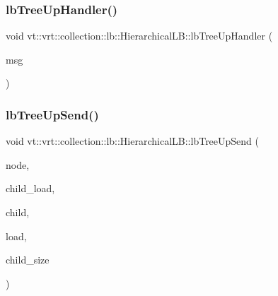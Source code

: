 \mbox{\label{structvt_1_1vrt_1_1collection_1_1lb_1_1_hierarchical_l_b_a3b67d27c10a6a7532c9c5d1a57ab722a}} 
\subsubsection{\texorpdfstring{lb\+Tree\+Up\+Handler()}{lbTreeUpHandler()}}
{\footnotesize\ttfamily void vt\+::vrt\+::collection\+::lb\+::\+Hierarchical\+L\+B\+::lb\+Tree\+Up\+Handler (\begin{DoxyParamCaption}\item[{\hyperlink{structvt_1_1vrt_1_1collection_1_1lb_1_1_l_b_tree_up_msg}{L\+B\+Tree\+Up\+Msg} $\ast$}]{msg }\end{DoxyParamCaption})\hspace{0.3cm}{\ttfamily [private]}}

\mbox{\label{structvt_1_1vrt_1_1collection_1_1lb_1_1_hierarchical_l_b_a8a9d35f8b4a8cd21461209136e64ad30}} 
\subsubsection{\texorpdfstring{lb\+Tree\+Up\+Send()}{lbTreeUpSend()}}
{\footnotesize\ttfamily void vt\+::vrt\+::collection\+::lb\+::\+Hierarchical\+L\+B\+::lb\+Tree\+Up\+Send (\begin{DoxyParamCaption}\item[{\hyperlink{namespacevt_a866da9d0efc19c0a1ce79e9e492f47e2}{Node\+Type} const}]{node,  }\item[{\hyperlink{structvt_1_1vrt_1_1collection_1_1lb_1_1_base_l_b_a215e22b9f12678303f49615ae3be05cc}{Load\+Type} const}]{child\+\_\+load,  }\item[{\hyperlink{namespacevt_a866da9d0efc19c0a1ce79e9e492f47e2}{Node\+Type} const}]{child,  }\item[{\hyperlink{structvt_1_1vrt_1_1collection_1_1lb_1_1_base_l_b_a331d7da5bbf2883238427d86b54ddd7b}{Obj\+Sample\+Type} const \&}]{load,  }\item[{\hyperlink{namespacevt_a866da9d0efc19c0a1ce79e9e492f47e2}{Node\+Type} const}]{child\+\_\+size }\end{DoxyParamCaption})\hspace{0.3cm}{\ttfamily [private]}}

